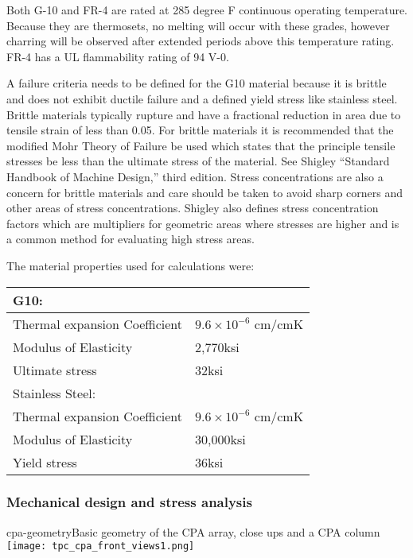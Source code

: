 Both G-10 and FR-4 are rated at 285 degree F continuous operating temperature. Because they are thermosets, no melting will occur with these grades, however charring will be observed after extended periods above this temperature rating. FR-4 has a UL flammability rating of 94 V-0.

A failure criteria needs to be defined for the G10 material because it is brittle and does not exhibit ductile failure and a defined yield stress like stainless steel.  Brittle materials typically rupture and have a fractional reduction in area due to tensile strain of less than 0.05.  For brittle materials it is recommended that the modified Mohr Theory of Failure be used which states that the principle tensile stresses be less than the ultimate stress of the material.  See Shigley ``Standard Handbook of Machine Design,'' third edition.   Stress concentrations are also a concern for brittle materials and care should be taken to avoid sharp corners and other areas of stress concentrations.  Shigley also defines stress concentration factors which are multipliers for geometric areas where stresses are higher and is a common method for evaluating high stress areas.  

The material properties used for calculations were:

\begin{tabular}{l l}
G10: 	& \\
\hline
Thermal expansion Coefficient	&	$9.6 \times 10^{-6}$ cm/cmK	\\
Modulus of Elasticity			&	2,770ksi				\\
\vspace{0.5em}Ultimate stress				&	32ksi				\\
Stainless Steel: & \\
\hline
Thermal expansion Coefficient	&	$9.6 \times 10^{-6}$ cm/cmK	\\
Modulus of Elasticity			&	30,000ksi				\\
Yield stress					&	36ksi				\\
\end{tabular}


\subsubsection{Mechanical design and stress analysis}

\begin{cdrfigure}{cpa-geometry}{Basic geometry of the CPA array, close ups and a CPA column} 
\texttt{[image: tpc\_cpa\_front\_views1.png]}
\end{cdrfigure}

